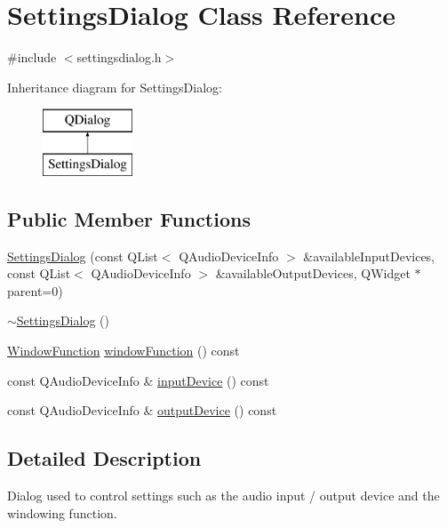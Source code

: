 \hypertarget{class_settings_dialog}{}\section{Settings\+Dialog Class Reference}
\label{class_settings_dialog}


{\ttfamily \#include $<$settingsdialog.\+h$>$}

Inheritance diagram for Settings\+Dialog\+:\begin{figure}[H]
\begin{center}
\leavevmode
\includegraphics[height=2.000000cm]{class_settings_dialog}
\end{center}
\end{figure}
\subsection*{Public Member Functions}
\begin{DoxyCompactItemize}
\item 
\hyperlink{class_settings_dialog_a50d64f2aa1317e9b10bd2ea1a6c011bb}{Settings\+Dialog} (const Q\+List$<$ Q\+Audio\+Device\+Info $>$ \&available\+Input\+Devices, const Q\+List$<$ Q\+Audio\+Device\+Info $>$ \&available\+Output\+Devices, Q\+Widget $\ast$parent=0)
\item 
\hyperlink{class_settings_dialog_ac48f54d4472902be0a3845a69167f068}{$\sim$\+Settings\+Dialog} ()
\item 
\hyperlink{spectrum_8h_adae4545e1609513867a86cc5e91fc1d4}{Window\+Function} \hyperlink{class_settings_dialog_a6cd9e3f301ccfa292d4205b20944aae0}{window\+Function} () const
\item 
const Q\+Audio\+Device\+Info \& \hyperlink{class_settings_dialog_a40d1decb770fb1fa322bd6e11ed3805f}{input\+Device} () const
\item 
const Q\+Audio\+Device\+Info \& \hyperlink{class_settings_dialog_afa48fa56f44b1e81def1ef936a35ed2f}{output\+Device} () const
\end{DoxyCompactItemize}


\subsection{Detailed Description}
Dialog used to control settings such as the audio input / output device and the windowing function. 

